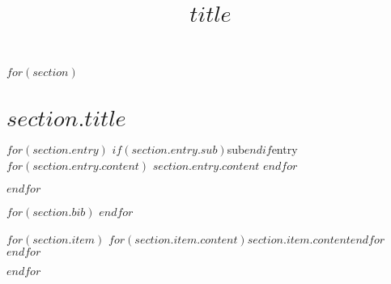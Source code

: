 \documentclass[a4paper]{moderncv}
\title{$title$}
\begin{document}
\maketitle
\nocite{*}

$for(section)$
\section{$section.title$}

$for(section.entry)$
\cv$if(section.entry.sub)$sub$endif$entry
$for(section.entry.content)$ {$section.entry.content$} $endfor$

$endfor$

$for(section.bib)$
\printbibliography[title={$section.bib.title$}, keyword=$section.bib.key$, heading=subbibliography]
$endfor$

$for(section.item)$
\cvitem
$for(section.item.content)${$section.item.content$}$endfor$
$endfor$

$endfor$
\end{document}
